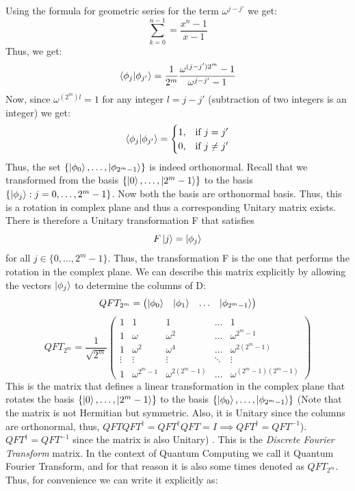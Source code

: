 Using the formula for geometric series for the term $\omega^{j-j'}$ we get:
\[
\sum_{k=0}^{n-1}=\frac{x^n-1}{x-1}
\]
Thus, we get:
\[
\braket{\phi_j|\phi_{j'}}=\frac{1}{2^m}\frac{\omega^{(j-j')2^m}-1}{\omega^{j-j'}-1}
\]
Now, since $\omega^{(2^m)l}=1$ for any integer $l=j-j'$ (subtraction of two integers is an integer) we get:
\[
    \braket{\phi_j|\phi_{j'}} = \begin{cases} 1, & \text{if } j=j' \\ 0, & \text{if } j\neq j' \end{cases}
\]
Thus, the set $\{\ket{\phi_0},\ldots,\ket{\phi_{2^m-1}}\}$ is indeed orthonormal.
Recall that we transformed from the basis $\{\ket{0},\ldots,\ket{2^m-1}\}$ to the basis $\{\ket{\phi_j}:j=0,\ldots,2^m-1\}$. Now both the basis are orthonormal basis.
Thus, this is a rotation in complex plane and thus a corresponding Unitary matrix exists.
There is therefore a Unitary transformation F that satisfies
\[
F\ket{j}=\ket{\phi_j}
\]
for all $j \in \{0,\ldots,2^m-1\}$. Thus, the transformation F is the one that performs the rotation in the complex plane.
We can describe this matrix explicitly by allowing the vectors $\ket{\phi_j}$ to determine the columns of D:
\[
QFT_{2^m}=\begin{pmatrix} \ket{\phi_0} & \ket{\phi_1} & \ldots & \ket{\phi_{2^m-1}} \end{pmatrix}
\]
\[
QFT_{2^m}=\frac{1}{\sqrt{2^m}}\begin{pmatrix} 1 & 1 & 1 & \ldots & 1 \\ 1 & \omega & \omega^2 & \ldots & \omega^{2^m-1} \\ 1 & \omega^2 & \omega^4 & \ldots & \omega^{2(2^m-1)} \\ \vdots & \vdots & \vdots & \ddots & \vdots \\ 1 & \omega^{2^m-1} & \omega^{2(2^m-1)} & \ldots & \omega^{(2^m-1)(2^m-1)} \end{pmatrix}
\]
This is the matrix that defines a linear transformation in the complex plane that rotates the basis $\{\ket{0},\ldots,\ket{2^m-1}\}$ to the basis $\{\ket{\phi_0},\ldots,\ket{\phi_{2^m-1}}\}$ (Note that the matrix is not Hermitian but symmetric. Also, it is Unitary since the 
columns are orthonormal, thus, $QFT QFT^{\dagger}=QFT^{\dagger}QFT=I \implies QFT^{\dagger}=QFT^{-1}$).
$QFT^{\dagger}=QFT^{-1}$ since the matrix is also Unitary) . This is the \textit{Discrete Fourier Transform} matrix. In the context of Quantum Computing we call it Quantum Fourier Transform, and for that reason it is also some times denoted as 
$QFT_{2^m}$. Thus, for convenience we can write it explicitly as:
